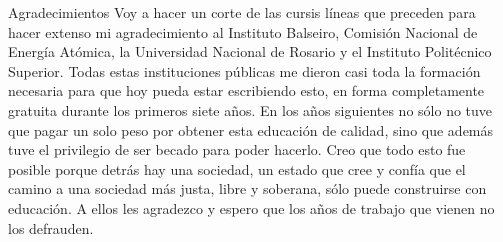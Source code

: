 \documentclass[12pt,papel,singlespace,oneside]{ibtesis}
\begin{document}
\begin{postliminary}
\begin{seccion}{Agradecimientos}
Voy a hacer un corte de las cursis líneas que preceden para hacer extenso mi agradecimiento al Instituto Balseiro, Comisión Nacional de Energía Atómica, la Universidad Nacional de Rosario y el Instituto Politécnico Superior. Todas estas instituciones públicas me dieron casi toda la formación necesaria para que hoy pueda estar escribiendo esto, en forma completamente gratuita durante los primeros siete años. En los años siguientes no sólo no tuve que pagar un solo peso por obtener esta educación de calidad, sino que además tuve el privilegio de ser becado para poder hacerlo. Creo que todo esto fue posible porque detrás hay una sociedad, un estado que cree y confía que el camino a una sociedad más justa, libre y soberana, sólo puede construirse con educación. A ellos les agradezco y espero que los años de trabajo que vienen no los defrauden.
\end{seccion}

\end{postliminary}
\end{document}
